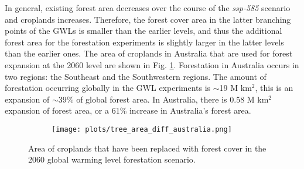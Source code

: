 \documentclass[]{article}
\begin{document}

In general, existing forest area decreases over the course of the \textit{ssp-585} scenario and croplands increases.
Therefore, the forest cover area in the latter branching points of the GWLs is smaller than the earlier levels, and thus the additional forest area for the forestation experiments is slightly larger in the latter levels than the earlier ones.
The area of croplands in Australia that are used for forest expansion at the 2060 level are shown in Fig. \ref{fig:to_forest}.
Forestation in Australia occurs in two regions: the Southeast and the Southwestern regions.
The amount of forestation occurring globally in the GWL experiments is $\sim$19 M km$^2$, this is an expansion of $\sim$39\% of global forest area.
In Australia, there is 0.58 M km$^2$ expansion of forest area, or a 61\% increase in Australia's forest area.

\begin{figure}[H]
    \begin{subfigure}[b]{\linewidth}
        \centering
        \texttt{[image: plots/tree\_area\_diff\_australia.png]}
    \end{subfigure}
    \caption{Area of croplands that have been replaced with forest cover in the 2060 global warming level forestation scenario.}
    \label{fig:to_forest}
\end{figure}
\end{document}
